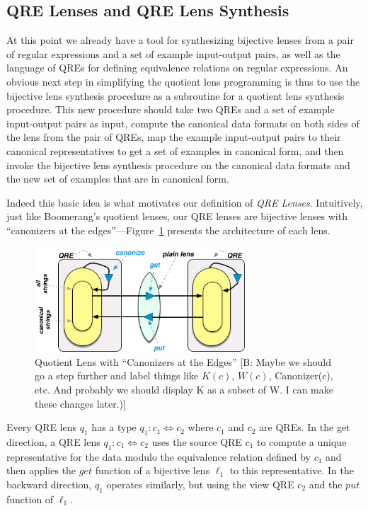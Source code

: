 \documentclass[acmsmall,review,anonymous]{acmart}
\newcommand{\FINISH}[3]{\ifdraft\textcolor{#1}{[#2: #3]}\fi}
\newcommand{\bcp}[1]{\FINISH{dkred}{B}{#1}}
\newcommand{\kw}[1]{\ensuremath{\mathit{#1}}}
\newcommand{\get}{\ensuremath{\kw{get}}}
\newcommand{\lput}{\ensuremath{\kw{put}}}
\begin{document}
\subsection{QRE Lenses and QRE Lens Synthesis}
\label{sec:examplesynth}
At this point we already have a tool for synthesizing bijective lenses from a
pair of regular expressions and a set of example input-output pairs, as well as
the language of QREs for defining equivalence relations on regular expressions.
An obvious next step in simplifying the quotient lens programming is thus to use
the bijective lens synthesis procedure as a subroutine for a quotient lens
synthesis procedure. This new procedure should take two QREs and a set
of example input-output pairs as input, compute the canonical data formats on
both sides of the lens from the pair of QREs, map the example input-output pairs
to their canonical representatives to get a set of examples in canonical form,
and then invoke the bijective lens synthesis procedure on the canonical data
formats and the new set of examples that are in canonical form.

Indeed this basic idea is what motivates our definition of {\em QRE Lenses}.
Intuitively, just like Boomerang's quotient lenses, our QRE lenses are bijective
lenses with ``canonizers at the edges''---Figure~\ref{fig:attheedges} presents
the architecture of each lens.
\begin{figure}[t]
\centering
\includegraphics[width=0.7\textwidth]{canonizers-outside}
\caption{Quotient Lens with ``Canonizers at the Edges''
\bcp{Maybe we should go a step further and label things like $K(c)$,
 $W(c)$, Canonizer(c), etc.  And probably we should display K as a subset of
 W.  I can make these changes later.)}}
\label{fig:attheedges}
\end{figure}
Every QRE lens $q_1$ has a type $q_1: c_1 \Leftrightarrow c_2$ where $c_1$ and $c_2$
are QREs. In the get direction, a QRE lens $q_1: c_1 \Leftrightarrow c_2$ uses the
source QRE $c_1$ to compute a unique representative for the data modulo the
equivalence relation defined by $c_1$ and then applies the $\get$ function of a
bijective lens $\ell_1$ to this representative. In the backward direction, $q_1$
operates similarly, but using the view QRE $c_2$ and the $\lput$ function of
$\ell_1$.
\end{document}
